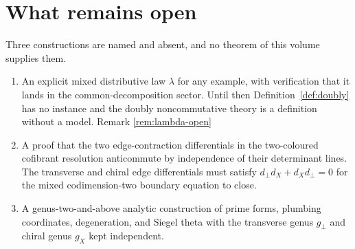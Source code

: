 \section{What remains open}

Three constructions are named and absent, and no theorem of this volume
supplies them.

\begin{enumerate}
\item An explicit mixed distributive law $\lambda$ for any example, with
  verification that it lands in the common-decomposition sector. Until
  then Definition~\ref{def:doubly} has no instance and the doubly
  noncommutative theory is a definition without a model.
  \hfill{\small Remark \ref{rem:lambda-open}}
\item A proof that the two edge-contraction differentials in the
  two-coloured cofibrant resolution anticommute by independence of their
  determinant lines. The transverse and chiral edge differentials must
  satisfy $d_\perp d_X + d_X d_\perp = 0$ for the mixed
  codimension-two boundary equation to close.
\item A genus-two-and-above analytic construction of prime forms, plumbing
  coordinates, degeneration, and Siegel theta with the transverse genus
  \(g_\perp\) and chiral genus \(g_X\) kept independent.
\end{enumerate}
